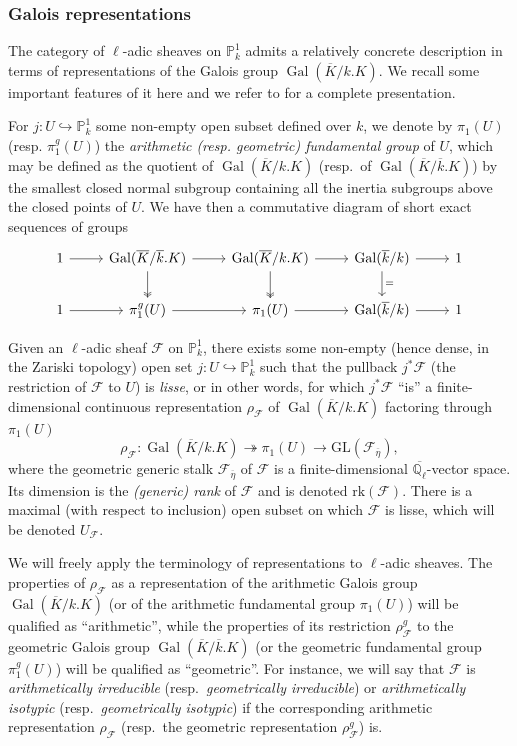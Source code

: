 \documentclass[12pt,a4paper,reqno]{amsart}
\numberwithin{equation}{section}
\DeclareMathOperator*\Gal{Gal}
\theoremstyle{plain}
\theoremstyle{definition}
\newcommand\Q{\mathbb{Q}}
\newcommand\ov{\overline}
\newcommand\mcF{\mathcal{F}}
\newcommand{\piar}{\pi_1}
\newcommand{\pige}{\pi_1^{g}}
\begin{document}
\subsubsection{Galois representations}

The category of $\ell$-adic sheaves on $\mathbb{P}_k^1$ admits a
relatively concrete description in terms of representations of the
Galois group $\Gal(\ov K/k.K)$. We recall some important features of
it here and we refer to \cite[4.4]{katz-sommes} for a complete
presentation.

For $j:U\hookrightarrow \mathbb{P}_k^1$ some non-empty open subset
defined over $k$, we denote by $\pi_1(U)$ (resp. $\pi^g_1(U)$) the
\emph{arithmetic (resp. geometric) fundamental group} of $U$, which may
be defined as the quotient of $\Gal(\overline K/k.K)$ (resp.\ of
$\Gal(\overline K/\ov k.K)$) by the smallest closed normal subgroup
containing all the inertia subgroups above the closed points of
$U$. We have then a commutative diagram of short exact sequences of
groups
\begin{equation}\label{exactseq}
\begin{tikzcd} 1\arrow{r}&  \Gal(\ov K/\ov k.K)\arrow{r}\arrow[two heads]{d}&\Gal(\ov K/k.K)\arrow{r}\arrow[two heads]{d}&\Gal(\ov k/k)\arrow{r}\arrow{d}{=}&1\\1\arrow{r}&\pige(U)\arrow{r}&\piar(U)\arrow{r}&\Gal(\ov k/k)\arrow{r}&1
\end{tikzcd}
\end{equation}

Given an $\ell$-adic sheaf $\mcF$ on $\mathbb{P}_k^1$, there exists
some non-empty (hence dense, in the Zariski topology) open set
$j:U\hookrightarrow \mathbb{P}_k^1$ such that the pullback $j^*\mcF$
(the restriction of $\mcF$ to $U$) is \emph{lisse}, or in other words,
for which $j^*\mcF$ ``is'' a finite-dimensional continuous representation
$\rho_{\mcF}$ of $\Gal(\overline{K}/k.K)$ factoring through $\pi_1(U)$
$$
\rho_\mcF \colon \Gal(\overline K/k.K )\twoheadrightarrow
\pi_1(U)\rightarrow \mathrm{GL}(\mcF_{\ov\eta}),
$$
where the geometric generic stalk $\mcF_{\overline\eta}$ of $\mcF$ is
a finite-dimensional $\overline{\Q_\ell}$-vector space. Its dimension
is the \emph{(generic) rank} of $\mcF$ and is denoted
$\mathrm{rk}(\mcF)$. There is a maximal (with respect to inclusion) open subset on
which $\mcF$ is lisse, which will be denoted $U_\mcF$.

We will freely apply the terminology of representations to $\ell$-adic
sheaves. The properties of $\rho_\mcF$ as a representation of the
arithmetic Galois group $\Gal(\ov K/k.K)$ (or of the arithmetic
fundamental group $\pi_1(U)$) will be qualified as ``arithmetic'',
while the properties of its restriction $\rho_\mcF^g$ to the
geometric Galois group $\Gal(\overline K/\ov k. K )$ (or the geometric
fundamental group $\pi_1^g(U)$) will be qualified as
``geometric''. For instance, we will say that $\mcF$ is {\em
  arithmetically irreducible} (resp.\ \emph{geometrically irreducible})
or \emph{arithmetically isotypic} (resp.\ \emph{geometrically
  isotypic}) if the corresponding arithmetic representation
$\rho_\mcF$ (resp.\ the geometric representation $\rho_\mcF^g$) is. 
\end{document}
